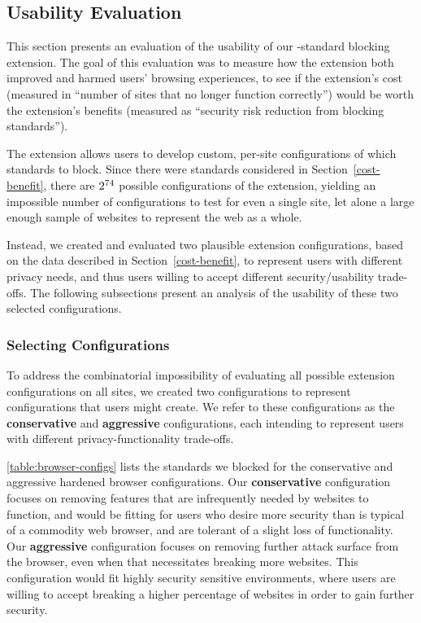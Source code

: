 \subsection{Usability Evaluation}
This section presents an evaluation of the usability of our \WAPI-standard
blocking extension.  The goal of this evaluation was to measure how the
extension both improved and harmed users' browsing experiences, to see if the
extension's cost (measured in ``number of sites that no longer function
correctly'') would be worth the extension's benefits (measured as ``security
risk reduction from blocking \WAPI standards'').

The extension allows users to develop custom, per-site configurations of which
\WAPI standards to block.  Since there were \NumStandards standards considered
in Section~\ref{cost-benefit}, there are \(2^{74}\) possible
configurations of the extension, yielding an impossible number of
configurations to test for even a single site, let alone a large enough sample
of websites to represent the web as a whole.

Instead, we created and evaluated two plausible extension configurations, based
on the data described in Section~\ref{cost-benefit}, to represent users with
different privacy needs, and thus users willing to accept different
security/usability trade-offs.  The following subsections present an analysis
of the usability of these two selected configurations.


\subsubsection{Selecting Configurations}
\label{current-web:extension:configurations}

To address the combinatorial impossibility of evaluating all possible extension
configurations on all sites, we created two configurations to represent
configurations that users might create.  We refer to these configurations as the
\textbf{conservative} and \textbf{aggressive} configurations, each intending to
represent users with different privacy-functionality trade-offs.

\ref{table:browser-configs} lists the standards we blocked for the conservative
and aggressive hardened browser configurations.  Our \textbf{conservative}
configuration focuses on removing features that are infrequently needed by
websites to function, and would be fitting for users who desire more security
than is typical of a commodity web browser, and are tolerant of a slight loss
of functionality.  Our \textbf{aggressive} configuration focuses on removing
further attack surface from the browser, even when that necessitates breaking
more websites.  This configuration would fit highly security sensitive
environments, where users are willing to accept breaking a higher percentage of
websites in order to gain further security.

